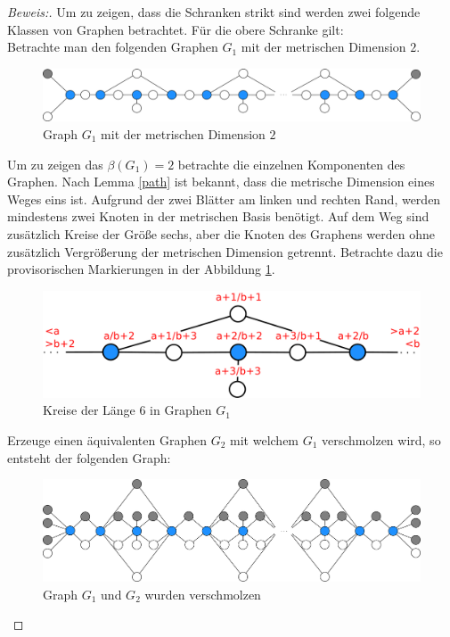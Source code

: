 \begin{proof}[Beweis:] 
Um zu zeigen, dass die Schranken strikt sind werden zwei folgende Klassen von Graphen betrachtet. Für die obere Schranke gilt:\\
Betrachte man den folgenden Graphen $G_1$ mit der metrischen Dimension $2$.
\begin{figure}[h!]
		\centering 		 
\includegraphics[width=420pt]{bilder/ver.pdf}
   \caption{Graph $G_1$ mit der metrischen Dimension $2$}
  	 \end{figure}
  	 \newpage
Um zu zeigen das $\beta(G_1)=2$ betrachte die einzelnen Komponenten des Graphen. Nach Lemma \ref{path} ist bekannt, dass die metrische Dimension eines Weges eins ist. Aufgrund der zwei Blätter am linken und rechten Rand, werden mindestens zwei Knoten in der metrischen Basis benötigt. Auf dem Weg sind zusätzlich Kreise der Größe sechs, aber die Knoten des Graphens werden ohne zusätzlich Vergrößerung der metrischen Dimension getrennt. Betrachte dazu die provisorischen Markierungen in der Abbildung \ref{bild:Kreise}.
\begin{figure}[h!]
		\centering 		 
\includegraphics[width=420pt]{bilder/ver2.pdf}
   \caption{Kreise der Länge 6 in Graphen $G_1$}
   \label{bild:Kreise}
  	 \end{figure} 
  	 
Erzeuge einen äquivalenten Graphen $G_2$ mit welchem $G_1$ verschmolzen wird, so entsteht der folgenden Graph:

\begin{figure}[h!]
		\centering 		 
\includegraphics[width=420pt]{bilder/verschmolzenlandmarks.pdf}
   \caption{Graph $G_1$ und $G_2$ wurden verschmolzen}
  	 \end{figure}


\end{proof}
